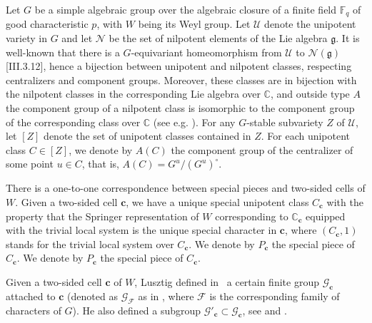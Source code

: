 \documentclass{amsart}
\theoremstyle{definition}
\DeclareMathOperator{\Irr}{Irr}
\DeclareMathOperator{\spr}{Spr}
\newcommand{\C}{\mathbb{C}}
\newcommand{\F}{\mathbb{F}}
\newcommand{\cF}{\mathcal{F}}
\newcommand{\cG}{\mathcal{G}}
\newcommand{\cL}{\mathcal{L}}
\newcommand{\cU}{\mathcal{U}}
\newcommand{\bc}{{\mathbf{c}}}
\newcommand{\0}{\mathcal{O}}
\begin{document}
Let $G$ be a simple algebraic group over the algebraic closure of a finite field $\F_q$ of good characteristic $p$, with $W$ being its Weyl group. Let $\cU$ denote the unipotent variety in $G$ and let ${\mathcal N}$ be the set of nilpotent elements of the Lie algebra ${\mathfrak g}$.
It is well-known that there is a $G$-equivariant homeomorphism from $\cU$ to ${\mathcal N}({\mathfrak g})$ \cite{sands}[III.3.12], hence a bijection between unipotent and nilpotent classes, respecting centralizers and component groups.
Moreover, these classes are in bijection with the nilpotent classes in the corresponding Lie algebra over $\C$, and outside type $A$ the component group of a nilpotent class is isomorphic to the component group of the corresponding class over $\C$ (see e.g. \cite{Premet}).
For any $G$-stable
 subvariety $Z$ of $\cU$, let $[Z]$ denote the set of unipotent classes
 contained in $Z$.  For each unipotent class $C \in [Z]$, we denote by $A(C)$
 the component group of the centralizer of some point $u \in C$, that is,
 $A(C) = G^u/(G^u)^\circ$. 
 

 
There is a one-to-one correspondence between special pieces and two-sided cells of $W$. Given a two-sided cell $\bc$, we have a unique special unipotent class $C_\bc$ with the property that the Springer representation of $W$ corresponding to $\C_\bc$ equipped with the trivial local system is the unique special character in $\bc$, where $(C_\bc,1)$ stands for the trivial local system over $C_\bc$. We denote by $P_\bc$ the special piece of $C_\bc$.
We denote by $P_\bc$ the special piece of $C_\bc$.
 

 
Given a two-sided cell $\bc$ of $W$, Lusztig defined  in~\cite{Lusztig1984} a certain finite group $\cG_\bc$  attached to $\bc$ (denoted as $\cG_\cF$ as in \cite{Lusztig1984}, where $\cF$ is the corresponding family of characters of $G$). He also defined a subgroup $\cG'_\bc \subset \cG_\bc$, see \cite[Theorem 0.4]{Lusztig:unipotent} and \cite[Theorem 2.1]{Achar-Sage-special}.
	
\end{document}
